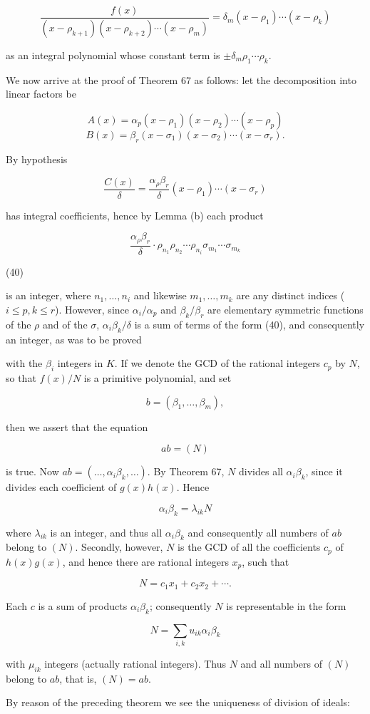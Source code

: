 $$\frac{f(x)}{(x - \rho_{k+1})(x - \rho_{k+2}) \cdots (x - \rho_m)} = \delta_m(x - \rho_1) \cdots (x - \rho_k)$$

as an integral polynomial whose constant term is $\pm \delta_m\rho_1 \cdots \rho_k$.

We now arrive at the proof of Theorem 67 as follows: let the decomposition into linear factors be

$$A(x) = \alpha_p(x - \rho_1)(x - \rho_2) \cdots (x - \rho_p)$$
$$B(x) = \beta_r(x - \sigma_1)(x - \sigma_2) \cdots (x - \sigma_r).$$

By hypothesis

$$\frac{C(x)}{\delta} = \frac{\alpha_\rho \beta_r}{\delta}(x - \rho_1) \cdots (x - \sigma_r)$$

has integral coefficients, hence by Lemma (b) each product

$$\frac{\alpha_\rho \beta_r}{\delta} \cdot \rho_{n_1} \rho_{n_2} \cdots \rho_{n_i} \sigma_{m_1} \cdots \sigma_{m_k}$$

(40)

is an integer, where $n_1, \ldots, n_i$ and likewise $m_1, \ldots, m_k$ are any distinct indices ($i \leq p, k \leq r$). However, since $\alpha_i/\alpha_p$ and $\beta_k/\beta_r$ are elementary symmetric functions of the $\rho$ and of the $\sigma$, $\alpha_i\beta_k/\delta$ is a sum of terms of the form (40), and consequently an integer, as was to be proved

with the $\beta_i$ integers in $K$. If we denote the GCD of the rational integers $c_p$ by $N$, so that $f(x)/N$ is a primitive polynomial, and set

$$b = (\beta_1, \ldots, \beta_m),$$

then we assert that the equation

$$ab = (N)$$

is true. Now $ab = (\ldots, \alpha_i \beta_k, \ldots)$. By Theorem 67, $N$ divides all $\alpha_i \beta_k$, since it divides each coefficient of $g(x)h(x)$. Hence

$$\alpha_i \beta_k = \lambda_{ik} N$$

where $\lambda_{ik}$ is an integer, and thus all $\alpha_i \beta_k$ and consequently all numbers of $ab$ belong to $(N)$. Secondly, however, $N$ is the GCD of all the coefficients $c_p$ of $h(x)g(x)$, and hence there are rational integers $x_p$, such that

$$N = c_1 x_1 + c_2 x_2 + \cdots.$$

Each $c$ is a sum of products $\alpha_i \beta_k$; consequently $N$ is representable in the form

$$N = \sum_{i,k} u_{ik} \alpha_i \beta_k$$

with $\mu_{ik}$ integers (actually rational integers). Thus $N$ and all numbers of $(N)$ belong to $ab$, that is, $(N) = ab$.

By reason of the preceding theorem we see the uniqueness of division of ideals:
